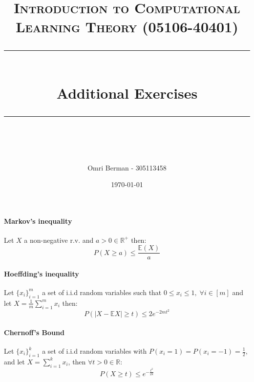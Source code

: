 \documentclass{article} %
\title{
\normalfont \normalsize 
\textsc{Introduction to Computational Learning Theory (05106-40401)} \\
[10pt] 
\rule{\linewidth}{0.5pt} \\[6pt] 
\huge Additional Exercises \\
\rule{\linewidth}{2pt}  \\[10pt]
}
\author{Omri Berman - 305113458}
\date{\normalsize \today}
\begin{document}
\maketitle
\noindent

\paragraph{Markov's inequality}
Let $X$ a non-negative r.v. and $a>0 \in \mathbb{R^+}$ then:
\begin{equation*}
    P(X\geq a) \leq \frac{\mathbb{E}(X)}{a}
\end{equation*}

\paragraph{Hoeffding's inequality}
Let $\{x_i\}_{i=1}^m$ a set of i.i.d random variables such that $0 \leq x_i \leq 1, \; \forall i \in [m]$ and let $X = \frac{1}{m} \sum_{i=1}^m x_i$ then:
\begin{equation*}
    P(|X - \mathbb{E}X| \geq t) \leq 2e^{-2mt^2}
\end{equation*}

\paragraph{Chernoff's Bound}
Let $\{x_i\}_{i=1}^k$ a set of i.i.d random variables with $P(x_i=1)= P(x_i=-1) = \frac{1}{2}$, and let $X = \sum_{i=1}^k x_i$, then $\forall t>0 \in \mathbb{R}$:
\begin{equation*}
    P(X\geq t) \leq e^{-\frac{t^2}{2k}}
\end{equation*}
\end{document}

